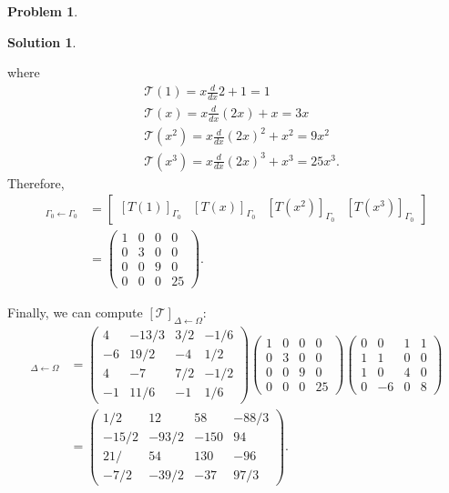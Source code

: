 \documentclass{article}
\theoremstyle{definition}
\newtheorem*{prob*}{Problem}
\newtheorem*{sln*}{Solution}
\newcommand{\T}{\mathcal{T}}
\begin{document}
\begin{prob*}
\begin{sln*}
\begin{enumerate}
\begin{enumerate}
				where
				\begin{align*}
				&\T(1) = x\frac{d}{dx}2 + 1 = 1\\
				&\T(x) = x\frac{d}{dx}(2x) + x = 3x\\
				&\T(x^2) = x\frac{d}{dx}(2x)^2 + x^2 = 9x^2\\
				&\T(x^3) = x\frac{d}{dx}(2x)^3 + x^3 = 25x^3.
				\end{align*}
				Therefore,
				\begin{align*}
				[\T]_{\Gamma_0\leftarrow\Gamma_0} &= \begin{bmatrix}
				[T(1)]_{\Gamma_0} & [T(x)]_{\Gamma_0} & [T(x^2)]_{\Gamma_0} & [T(x^3)]_{\Gamma_0}
				\end{bmatrix}\\
				&= \begin{pmatrix}
				1&0&0&0\\
				0&3&0&0\\
				0&0&9&0\\
				0&0&0&25
				\end{pmatrix}.
				\end{align*}
				
				Finally, we can compute $[\T]_{\Delta\leftarrow\Omega}$:
				\begin{align*}
				[\T]_{\Delta\leftarrow\Omega} &=     
				\begin{pmatrix}
				4&-13/3&3/2&-1/6\\
				-6&19/2&-4&1/2\\
				4&-7&7/2&-1/2\\
				-1&11/6&-1&1/6
				\end{pmatrix}
				\begin{pmatrix}
				1&0&0&0\\
				0&3&0&0\\
				0&0&9&0\\
				0&0&0&25
				\end{pmatrix}
				\begin{pmatrix}
				0&0&1&1\\
				1&1&0&0\\
				1&0&4&0\\
				0&-6&0&8
				\end{pmatrix}\\
				&= \begin{pmatrix}
				1/2&12&58&-88/3\\
				-15/2& -93/2& -150& 94\\
				21/& 54& 130& -96\\
				-7/2& -39/2& -37& 97/3
				\end{pmatrix}.
				\end{align*}
				

\end{enumerate}
\end{enumerate}
\end{sln*}
\end{prob*}
\end{document}
